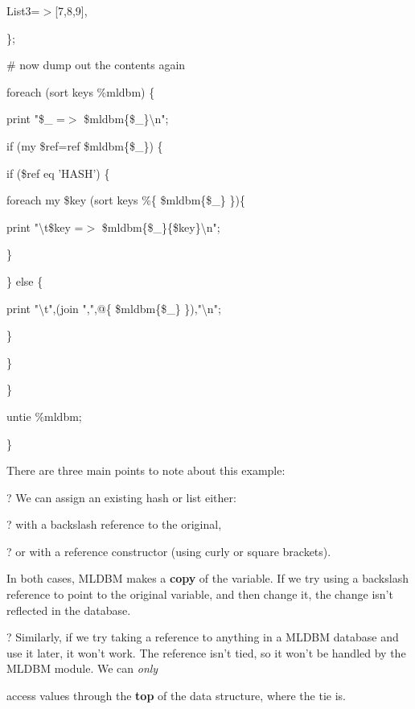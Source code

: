 \documentclass[a4paper,11pt]{book}
\begin{document}
\noindent List3=$>$[7,8,9],

\noindent \};

\noindent 

\noindent 

\noindent \# now dump out the contents again

\noindent foreach (sort keys \%mldbm) \{

\noindent print "\$\_  =$>$ \$mldbm\{\$\_\}\textbackslash n";

\noindent if (my \$ref=ref \$mldbm\{\$\_\}) \{

\noindent if (\$ref eq 'HASH') \{

\noindent foreach my \$key (sort keys \%\{ \$mldbm\{\$\_\} \})\{ 

\noindent print "\textbackslash t\$key =$>$ \$mldbm\{\$\_\}\{\$key\}\textbackslash n";

\noindent \}

\noindent \} else \{

\noindent print "\textbackslash t",(join ",",@\{ \$mldbm\{\$\_\} \}),"\textbackslash n";

\noindent \}

\noindent \}

\noindent \}

\noindent 

\noindent untie \%mldbm;

\noindent \}

\noindent 

\noindent There are three main points to note about this example:

\noindent 

\noindent ? We can assign an existing hash or list either:

\noindent ? with a backslash reference to the original,

\noindent ? or with a reference constructor (using curly or square brackets).

\noindent In both cases, MLDBM makes a \textbf{copy }of the variable. If we try using a backslash reference to point to the original variable, and then change it, the change isn't reflected in the database.

\noindent 

\noindent ? Similarly, if we try taking a reference to anything in a MLDBM database and use it later, it won't work. The reference isn't tied, so it won't be handled by the MLDBM module. We can \textit{only}

\noindent access values through the \textbf{top }of the data structure, where the tie is.
\end{document}
